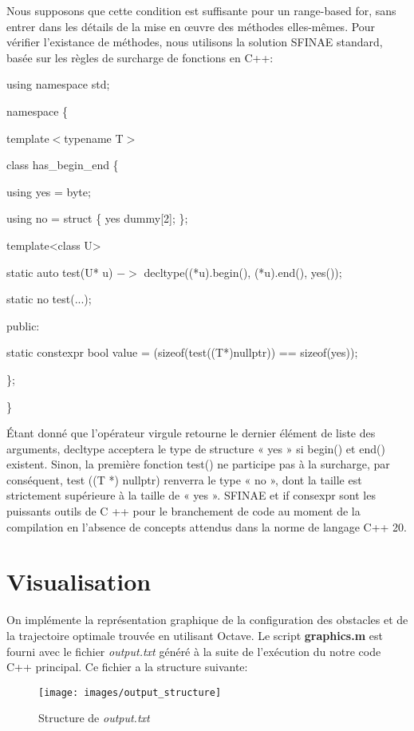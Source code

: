 \documentclass[12pt]{article}
\begin{document}
	Nous supposons que cette condition est suffisante pour un range-based for, sans entrer dans les détails de la mise en œuvre des méthodes elles-mêmes. Pour vérifier l'existance de méthodes, nous utilisons la solution SFINAE standard, basée sur les règles de surcharge de fonctions en C++:
	
	{
		\selectfont
		\setlength{\parindent}{2em}
		using namespace std;
		
		namespace \{
		
		template$<$typename T$>$
		
		class has\_begin\_end \{
		
		\setlength{\parindent}{4em}
		using yes = byte;
		
		using no = struct \{ yes dummy[2]; \};
		
		template<class U>
		
		static auto test(U* u) $->$ decltype((*u).begin(), (*u).end(), yes());
		
		static no   test(...);
		
		\setlength{\parindent}{2em}	
		public:
		
		\setlength{\parindent}{4em}
		static constexpr bool value =
		(sizeof(test((T*)nullptr)) == sizeof(yes));
		
		\setlength{\parindent}{2em}
		\};
		
		\}
	}
	
	Étant donné que l'opérateur virgule retourne le dernier élément de liste des arguments, decltype acceptera le type de structure « yes » si begin() et end() existent. Sinon, la première fonction test() ne participe pas à la surcharge, par conséquent, test ((T *) nullptr) renverra le type « no », dont la taille est strictement supérieure à la taille de « yes ». SFINAE et if consexpr sont les puissants outils de C ++ pour le branchement de code au moment de la compilation en l'absence de concepts attendus dans la norme de langage C++ 20.
	
	\section{Visualisation}
	On implémente la représentation graphique de la configuration des obstacles et de la trajectoire optimale trouvée en utilisant Octave. Le script \textbf{graphics.m} est fourni avec le fichier \textit{output.txt} généré à la suite de l'exécution du notre code C++ principal. Ce fichier a la structure suivante:
	
	\begin{figure}[H]
		\centering
		\texttt{[image: images/output\_structure]}
		\caption{Structure de \textit{output.txt}}
		\label{fig:output_structure}
	\end{figure}
	
\end{document}
